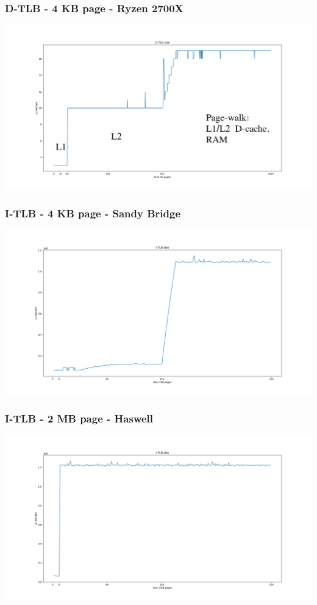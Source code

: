 \documentclass{beamer}
\begin{document}
\begin{frame}
\frametitle{D-TLB - 4 KB page - Ryzen 2700X}
\includegraphics[scale=.18]{img/dtlb_size_zen.png}
\end{frame}

\begin{frame}
\frametitle{I-TLB - 4 KB page - Sandy Bridge}
\includegraphics[scale=.18]{img/itlb_size.png}
\end{frame}

\begin{frame}
\frametitle{I-TLB - 2 MB page - Haswell}
\includegraphics[scale=.24]{img/itlb_2mb_size.png}
\end{frame}
\end{document}
